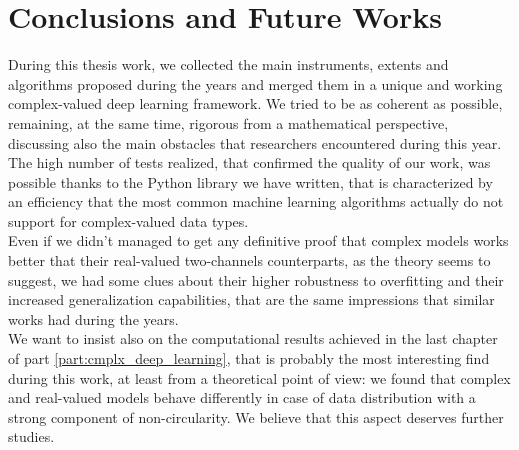 \documentclass[../main.tex]{subfiles}
\begin{document}
	

\chapter*{Conclusions and Future Works}

During this thesis work, we collected the main instruments, extents and algorithms proposed during the years and merged them in a unique and working complex-valued deep learning framework. We tried to be as coherent as possible, remaining, at the same time, rigorous from a mathematical perspective, discussing also the main obstacles that researchers encountered during this year. The high number of tests realized, that confirmed the quality of our work, was possible thanks to the Python library we have written, that is characterized by an efficiency that the most common machine learning algorithms actually do not support for complex-valued data types.\\
Even if we didn't managed to get any definitive proof that complex models works better that their real-valued two-channels counterparts, as the theory seems to suggest, we had some clues about their higher robustness to overfitting and their increased generalization capabilities, that are the same impressions that similar works had during the years.\\
We want to insist also on the computational results achieved in the last chapter of part \ref{part:cmplx_deep_learning}, that is probably the most interesting find during this work, at least from a theoretical point of view: we found that complex and real-valued models behave differently in case of data distribution with a strong component of non-circularity. We believe that this aspect deserves further studies.
	
	
	
\end{document}
